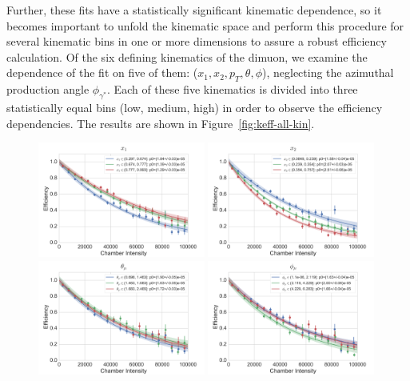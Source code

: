 Further, these fits have a statistically significant kinematic dependence, so it becomes important to unfold the kinematic space and perform this procedure for several kinematic bins in one or more dimensions to assure a robust efficiency calculation. Of the six defining kinematics of the dimuon, we examine the dependence of the fit on five of them: ($x_1, x_2, p_T, \theta, \phi$), neglecting the azimuthal production angle $\phi_{\gamma^*}$. Each of these five kinematics is divided into three statistically equal bins (low, medium, high) in order to observe the efficiency dependencies. The results are shown in Figure~\ref{fig:keff-all-kin}.
\begin{figure}
\centering
\includegraphics[width=0.49\textwidth]{figures/analysis/x1-keff-int.png}
\includegraphics[width=0.49\textwidth]{figures/analysis/x2-keff-int.png} \\ \vspace{20px}
\includegraphics[width=0.49\textwidth]{figures/analysis/theta-keff-int.png}
\includegraphics[width=0.49\textwidth]{figures/analysis/phi-keff-int.png} \\ \vspace{20px}

\end{figure}
